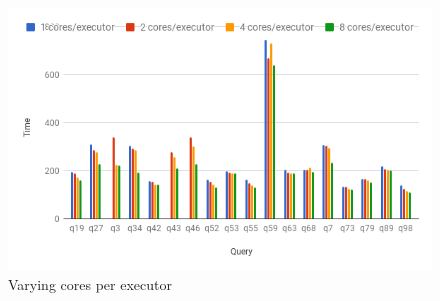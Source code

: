 \begin{figure}[h]
	\includegraphics[width=\linewidth]{fig/varycore.png}
	\caption{Varying cores per executor}
	\label{fig:varycore}
\end{figure}
